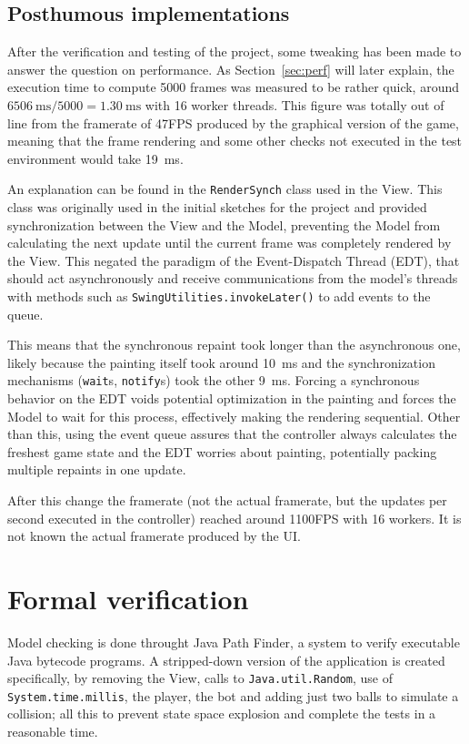 \documentclass{scrartcl}
\begin{document}
\subsection{Posthumous implementations}\label{sec:post-impl}
After the verification and testing of the project, some tweaking has been made to answer the question on 
performance.
As Section~\ref{sec:perf} will later explain, the execution time to compute 5000 frames was measured to be
rather quick, around $\qty{6506}{\milli\second}/5000=\qty{1.30}{\milli\second}$ with 16 worker threads.
This figure was totally out of line from the framerate of 47FPS produced by the graphical version of the game,
meaning that the frame rendering and some other checks not executed in the test environment would take \qty{19}{\milli\second}.

An explanation can be found in the \texttt{RenderSynch} class used in the View. This class was originally used
in the initial sketches for the project and provided synchronization between the View and the Model, preventing
the Model from calculating the next update until the current frame was completely rendered by the View.
This negated the paradigm of the Event-Dispatch Thread (EDT), that should act asynchronously and receive
communications from the model's threads with methods such as \texttt{SwingUtilities}\texttt{.invokeLater()} to add
events to the queue.

This means that the synchronous repaint took longer than the asynchronous one, likely because the painting
itself took around \qty{10}{\milli\second} and the synchronization mechanisms (\texttt{wait}s, \texttt{notify}s) took
the other \qty{9}{\milli\second}.
Forcing a synchronous behavior on the EDT voids potential optimization in the painting and forces
the Model to wait for this process, effectively making the rendering sequential.
Other than this, using the event queue assures that the controller always calculates the freshest game state
and the EDT worries about painting, potentially packing multiple repaints in one update. 

After this change the framerate (not the actual framerate, but the updates per second executed in the controller) reached
around 1100FPS with 16 workers. It is not known the actual framerate produced by the UI.

\section{Formal verification}
Model checking is done throught Java Path Finder, a system to verify executable Java bytecode programs. A stripped-down
version of the application is created specifically, by removing the View, calls to \texttt{Java.util.Random},
use of \texttt{System.time.millis},
the player, the bot and adding just two balls to simulate a collision; all this to prevent state space explosion
and complete the tests in a reasonable time.
\end{document}
